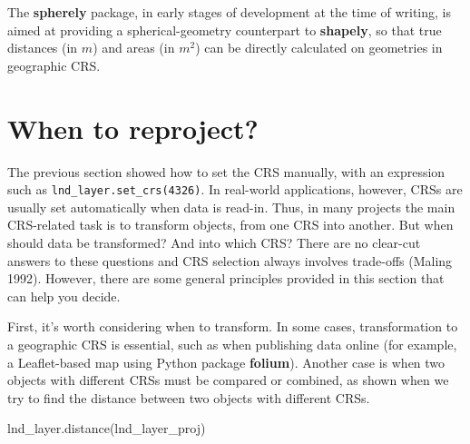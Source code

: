 \documentclass[
  letterpaper,
]{krantz}
\newenvironment{Shaded}{\begin{snugshade}}{\end{snugshade}}
\newcommand{\NormalTok}[1]{\textcolor[rgb]{0.00,0.23,0.31}{#1}}
\begin{document}
\begin{tcolorbox}[enhanced jigsaw, breakable, title=\textcolor{quarto-callout-note-color}{\faInfo}\hspace{0.5em}{Note}, arc=.35mm, opacitybacktitle=0.6, left=2mm, colback=white, bottomrule=.15mm, bottomtitle=1mm, toptitle=1mm, colframe=quarto-callout-note-color-frame, leftrule=.75mm, rightrule=.15mm, toprule=.15mm, titlerule=0mm, opacityback=0, colbacktitle=quarto-callout-note-color!10!white, coltitle=black]

The \textbf{spherely}\footnotemark{} package, in early stages of
development at the time of writing, is aimed at providing a
spherical-geometry counterpart to \textbf{shapely}, so that true
distances (in \(m\)) and areas (in \(m^2\)) can be directly calculated
on geometries in geographic CRS.

\end{tcolorbox}


\section{When to reproject?}\label{sec-when-to-reproject}

The previous section showed how to set the CRS manually, with an
expression such as \texttt{lnd\_layer.set\_crs(4326)}. In real-world
applications, however, CRSs are usually set automatically when data is
read-in. Thus, in many projects the main CRS-related task is to
transform objects, from one CRS into another. But when should data be
transformed? And into which CRS? There are no clear-cut answers to these
questions and CRS selection always involves trade-offs (Maling 1992).
However, there are some general principles provided in this section that
can help you decide.

First, it's worth considering when to transform. In some cases,
transformation to a geographic CRS is essential, such as when publishing
data online (for example, a Leaflet-based map using Python package
\textbf{folium}). Another case is when two objects with different CRSs
must be compared or combined, as shown when we try to find the distance
between two objects with different CRSs.

\begin{Shaded}
\begin{Highlighting}[]
\NormalTok{lnd\_layer.distance(lnd\_layer\_proj)}
\end{Highlighting}
\end{Shaded}
\end{document}

